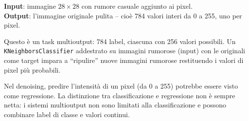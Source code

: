 \begin{exbox}
\textbf{Input}: immagine $28 \times 28$ con rumore casuale aggiunto ai pixel.\\
\textbf{Output}: l'immagine originale pulita -- cioè 784 valori interi da 0 a 255, uno per pixel.

Questo è un task multioutput: 784 label, ciascuna con 256 valori possibili. Un \texttt{KNeighborsClassifier} addestrato su immagini rumorose (input) con le originali come target impara a ``ripulire'' nuove immagini rumorose restituendo i valori di pixel più probabili.
\end{exbox}

\begin{notebox}
Nel denoising, predire l'intensità di un pixel (da 0 a 255) potrebbe essere visto come regressione. La distinzione tra classificazione e regressione non è sempre netta: i sistemi multioutput non sono limitati alla classificazione e possono combinare label di classe e valori continui.
\end{notebox}